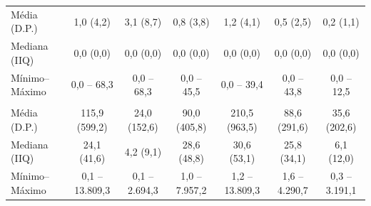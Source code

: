 \begin{table}[!h]
{\begin{tabular}[t]{lcccccc}
\hspace{1em}Média (D.P.) & 1,0 (4,2) & 3,1 (8,7) & 0,8 (3,8) & 1,2 (4,1) & 0,5 (2,5) & 0,2 (1,1)\\
\hspace{1em}Mediana (IIQ) & 0,0 (0,0) & 0,0 (0,0) & 0,0 (0,0) & 0,0 (0,0) & 0,0 (0,0) & 0,0 (0,0)\\
\hspace{1em}Mínimo–Máximo & 0,0 – 68,3 & 0,0 – 68,3 & 0,0 – 45,5 & 0,0 – 39,4 & 0,0 – 43,8 & 0,0 – 12,5\\
\addlinespace[0.3em]
\multicolumn{7}{l}{\textbf{Densidade demográfica (hab/km²)}}\\
\hspace{1em}Média (D.P.) & 115,9 (599,2) & 24,0 (152,6) & 90,0 (405,8) & 210,5 (963,5) & 88,6 (291,6) & 35,6 (202,6)\\
\hspace{1em}Mediana (IIQ) & 24,1 (41,6) & 4,2 (9,1) & 28,6 (48,8) & 30,6 (53,1) & 25,8 (34,1) & 6,1 (12,0)\\
\hspace{1em}Mínimo–Máximo & 0,1 – 13.809,3 & 0,1 – 2.694,3 & 1,0 – 7.957,2 & 1,2 – 13.809,3 & 1,6 – 4.290,7 & 0,3 – 3.191,1\\
\bottomrule
\end{tabular}}
\end{table}
